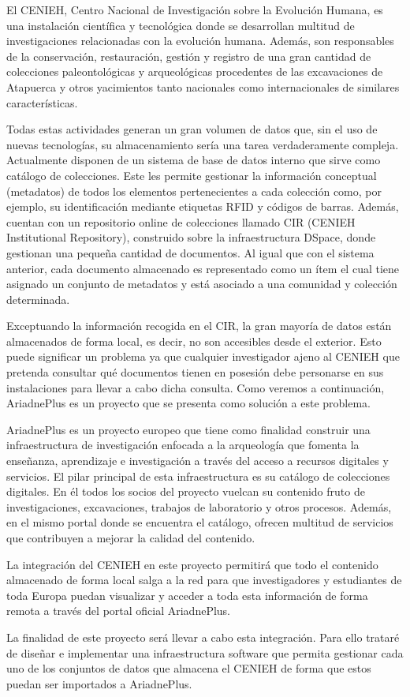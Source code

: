 
El CENIEH, Centro Nacional de Investigación sobre la Evolución Humana, es una instalación científica y tecnológica donde se desarrollan multitud de investigaciones relacionadas con la evolución humana. Además, son responsables de la conservación, restauración, gestión y registro de una gran cantidad de colecciones paleontológicas y arqueológicas procedentes de las excavaciones de Atapuerca y otros yacimientos tanto nacionales como internacionales de similares características.

Todas estas actividades generan un gran volumen de datos que, sin el uso de nuevas tecnologías, su almacenamiento sería una tarea verdaderamente compleja. Actualmente disponen de un sistema de base de datos interno que sirve como catálogo de colecciones. Este les permite gestionar la información conceptual (metadatos) de todos los elementos pertenecientes a cada colección como, por ejemplo, su identificación mediante etiquetas RFID y códigos de barras. Además, cuentan con un repositorio online de colecciones llamado CIR (CENIEH Institutional Repository), construido sobre la infraestructura DSpace, donde gestionan una pequeña cantidad de documentos. Al igual que con el sistema anterior, cada documento almacenado es representado como un ítem el cual tiene asignado un conjunto de metadatos y está asociado a una comunidad y colección determinada. 

Exceptuando la información recogida en el CIR, la gran mayoría de datos están almacenados de forma local, es decir, no son accesibles desde el exterior. Esto puede significar un problema ya que cualquier investigador ajeno al CENIEH que pretenda consultar qué documentos tienen en posesión debe personarse en sus instalaciones para llevar a cabo dicha consulta. Como veremos a continuación, AriadnePlus es un proyecto que se presenta como solución a este problema.

AriadnePlus es un proyecto europeo que tiene como finalidad construir una infraestructura de investigación enfocada a la arqueología que fomenta la enseñanza, aprendizaje e investigación a través del acceso a recursos digitales y servicios. El pilar principal de esta infraestructura es su catálogo de colecciones digitales. En él todos los socios del proyecto vuelcan su contenido fruto de investigaciones, excavaciones, trabajos de laboratorio y otros procesos. Además, en el mismo portal donde se encuentra el catálogo, ofrecen multitud de servicios que contribuyen a mejorar la calidad del contenido.

La integración del CENIEH en este proyecto permitirá que todo el contenido almacenado de forma local salga a la red para que investigadores y estudiantes de toda Europa puedan visualizar y acceder a toda esta información de forma remota a través del portal oficial AriadnePlus.

La finalidad de este proyecto será llevar a cabo esta integración. Para ello trataré de diseñar e implementar una infraestructura software que permita gestionar cada uno de los conjuntos de datos que almacena el CENIEH de forma que estos puedan ser importados a AriadnePlus. 


